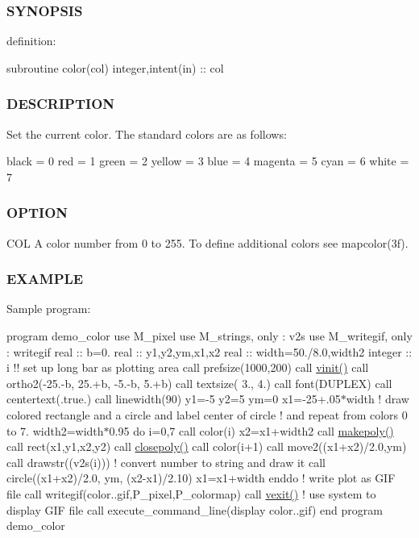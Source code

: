 \subsubsection*{S\+Y\+N\+O\+P\+S\+IS}

definition\+:

subroutine color(col) integer,intent(in) \+:\+: col

\subsubsection*{D\+E\+S\+C\+R\+I\+P\+T\+I\+ON}

Set the current color. The standard colors are as follows\+:

black = 0 red = 1 green = 2 yellow = 3 blue = 4 magenta = 5 cyan = 6 white = 7

\subsubsection*{O\+P\+T\+I\+ON}

C\+OL A color number from 0 to 255. To define additional colors see mapcolor(3f).

\subsubsection*{E\+X\+A\+M\+P\+LE}

Sample program\+:

program demo\+\_\+color use M\+\_\+pixel use M\+\_\+strings, only \+: v2s use M\+\_\+writegif, only \+: writegif real \+:\+: b=0. real \+:\+: y1,y2,ym,x1,x2 real \+:\+: width=50./8.0,width2 integer \+:\+: i !! set up long bar as plotting area call prefsize(1000,200) call \hyperlink{namespacem__pixel_ac03ca8f23fdadb60599b6ea4dc87a6d9}{vinit()} call ortho2(-\/25.-\/b, 25.+b, -\/5.-\/b, 5.+b) call textsize( 3., 4.) call font(\textquotesingle{}D\+U\+P\+L\+EX\textquotesingle{}) call centertext(.true.) call linewidth(90) y1=-\/5 y2=5 ym=0 x1=-\/25+.05$\ast$width ! draw colored rectangle and a circle and label center of circle ! and repeat from colors 0 to 7. width2=width$\ast$0.95 do i=0,7 call color(i) x2=x1+width2 call \hyperlink{namespacem__pixel_ab7128437f95b40004bf73fc6e3f597f8}{makepoly()} call rect(x1,y1,x2,y2) call \hyperlink{namespacem__pixel_ab3dc83b63d2ab1bf3f63932abca4245d}{closepoly()} call color(i+1) call move2((x1+x2)/2.0,ym) call drawstr((v2s(i))) ! convert number to string and draw it call circle((x1+x2)/2.0, ym, (x2-\/x1)/2.10) x1=x1+width enddo ! write plot as G\+IF file call writegif(\textquotesingle{}color..\+gif\textquotesingle{},P\+\_\+pixel,P\+\_\+colormap) call \hyperlink{namespacem__pixel_a19ad6b65752322b0029a62cc0ebec3e8}{vexit()} ! use system to display G\+IF file call execute\+\_\+command\+\_\+line(\textquotesingle{}display color..\+gif\textquotesingle{}) end program demo\+\_\+color 

